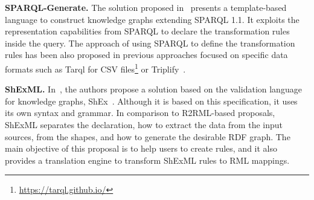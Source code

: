 \noindent\textbf{SPARQL-Generate.} The solution proposed in~\citep{lefranccois2017sparql} presents a template-based language to construct knowledge graphs extending SPARQL 1.1. It exploits the representation capabilities from SPARQL to declare the transformation rules inside the query. The approach of using SPARQL to define the transformation rules has been also proposed in previous approaches focused on specific data formats such as Tarql for CSV files\footnote{\url{https://tarql.github.io/}} or Triplify~\citep{auer2009triplify}. %

\noindent\textbf{ShExML.} In~\citep{garcia2020shexml}, the authors propose a solution based on the validation language for knowledge graphs, ShEx~\citep{prud2014shape}. Although it is based on this specification, it uses its own syntax and grammar. In comparison to R2RML-based proposals, ShExML separates the declaration, how to extract the data from the input sources, from the shapes, and how to generate the desirable RDF graph. The main objective of this proposal is to help users to create rules, and it also provides a translation engine to transform ShExML rules to RML mappings.


